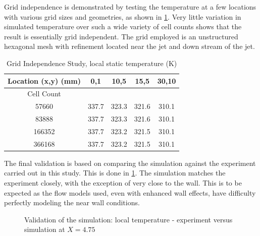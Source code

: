 \documentclass[preprint,12pt]{elsarticle}
\begin{document}
Grid independence is demonstrated by testing the temperature at a few locations with various grid sizes and geometries, as shown in \cref{tab:gridjet}.  Very little variation in simulated temperature over such a wide variety of cell counts shows that the result is essentially grid independent.  The grid employed is an unstructured hexagonal mesh with refinement located near the jet and down stream of the jet.
\begin{table}[!t!b!p]
\begin{center}
\begin{tabular}{ c c c c c }
\hline
 Location (x,y) (mm) & 0,1 & 10,5 & 15,5& 30,10 \\ \hline \hline
 Cell Count & \\ \hline
 57660  & 337.7 & 323.3 & 321.6 & 310.1 \\ \hline
 83888  & 337.7 & 323.3 & 321.6 & 310.1 \\ \hline
 166352 & 337.7 & 323.2 & 321.5 & 310.1 \\ \hline
 366168 & 337.7 & 323.2 & 321.5 & 310.1 \\ \hline
\end{tabular}
\caption{Grid Independence Study, local static temperature (K)}
\label{tab:gridjet}
\end{center}
\end{table}

%	

The final validation is based on comparing the simulation against the experiment carried out in this study.  This is done in \cref{fig:jetexp15}.  The simulation matches the experiment closely, with the exception of very close to the wall.  This is to be expected as the flow models used, even with enhanced wall effects, have difficulty perfectly modeling the near wall conditions.
\begin{figure}[!htbp]
	\centering
	\setlength\figureheight{5cm} 
	\setlength\figurewidth{5cm}
	
	\caption{Validation of the simulation: local temperature - experiment versus simulation at $X=4.75$}
	\label{fig:jetexp15}
\end{figure}
\end{document}
